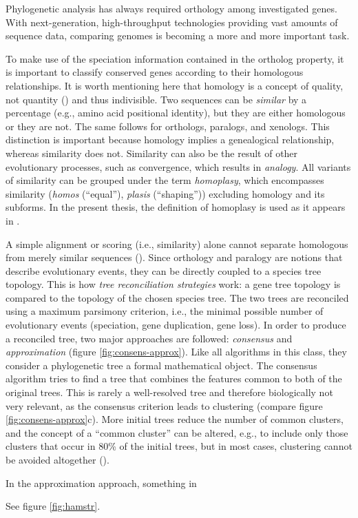 Phylogenetic analysis has always required orthology among investigated genes.
With next-generation, high-throughput technologies providing vast amounts of
sequence data, comparing genomes is becoming a more and more important task. 

To make use of the speciation information contained in the ortholog property, it
is important to classify conserved genes according to their homologous
relationships. It is worth mentioning here that homology is a concept of
quality, not quantity (\cite{reeck1987}) and thus indivisible. Two sequences can
be \emph{similar} by a percentage (e.g., amino acid positional identity), but
they are either homologous or they are not. The same follows for orthologs,
paralogs, and xenologs. This distinction is important because homology implies a
genealogical relationship, whereas similarity does not. Similarity can also be
the result of other evolutionary processes, such as convergence, which results
in \emph{analogy}. All variants of similarity can be grouped under the term
\emph{homoplasy}, which encompasses similarity (\emph{homos} (``equal''),
\emph{plasis} (``shaping'')) excluding homology and its subforms. In the present
thesis, the definition of homoplasy is used as it appears in \cite{page1998}.

A simple alignment or scoring (i.e., similarity) alone cannot separate
homologous from merely similar sequences (\cite{eisen1998}). Since orthology and
paralogy are notions that describe evolutionary events, they can be directly
coupled to a species tree topology. This is how \emph{tree reconciliation
strategies} work: a gene tree topology is compared to the topology of the chosen
species tree. The two trees are reconciled using a maximum parsimony criterion,
i.e., the minimal possible number of evolutionary events (speciation, gene
duplication, gene loss). In order to produce a reconciled tree, two major
approaches are followed: \emph{consensus} and \emph{approximation} (figure
\ref{fig:consens-approx}). Like all algorithms in this class, they consider a
phylogenetic tree a formal mathematical object. The consensus algorithm tries to
find a tree that combines the features common to both of the original trees.
This is rarely a well-resolved tree and therefore biologically not very
relevant, as the consensus criterion leads to clustering (compare figure
\ref{fig:consens-approx}c). More initial trees reduce the number of common
clusters, and the concept of a ``common cluster'' can be altered, e.g., to
include only those clusters that occur in 80\% of the initial trees, but in most
cases, clustering cannot be avoided altogether (\cite{mirkin1995}).

In the approximation approach, 
something in \cite{page1997}



See figure \ref{fig:hamstr}.

